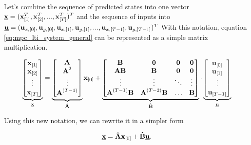 \documentclass{article}
\newcommand{\uvec}{\textbf{\underline{u}}}
\begin{document}
Let's combine the sequence of predicted states into one vector $\textbf{\underline{x}} = (\textbf{x}_{[1]}^T, \textbf{x}_{[2]}^T, ..., \textbf{x}_{[T]}^T)^T$ and the sequence of inputs into 
$\uvec = (\textbf{u}_{x,[0]}, \textbf{u}_{y,[0]}, \textbf{u}_{x,[1]}, \textbf{u}_{y,[1]}, ..., \textbf{u}_{x,[T-1]}, \textbf{u}_{y,[T-1]})^T$
With this notation, equation \ref{eq:mpc_lti_system_general} can be represented as a simple matrix multiplication.

\begin{equation}
\label{eq:prediction_big}
\underbrace{
\begin{bmatrix}
\textbf{x}_{[1]} \\
\textbf{x}_{[2]} \\
\vdots \\
\textbf{x}_{[T]} \\
\end{bmatrix}}_{\textbf{\underline{x}}}
=
\underbrace{
\begin{bmatrix}
\textbf{A} \\
\textbf{A}^2 \\
\vdots \\
\textbf{A}^{(T-1)} \\
\end{bmatrix}}_{\textbf{\^A}}
\textbf{x}_{[0]}
+
\underbrace{
\begin{bmatrix}
\textbf{B} & \textbf{0} & \textbf{0} & \textbf{0} \\
\textbf{AB} & \textbf{B} & \textbf{0} & \textbf{0} \\
\vdots & \vdots & \ddots & \vdots \\
\textbf{A}^{(T-1)}\textbf{B} & \textbf{A}^{(T-2)}\textbf{B} & \hdots & \textbf{B}
\end{bmatrix}
}_{\textbf{\^B}}
\cdot
\underbrace{
\begin{bmatrix}
\textbf{u}_{[0]} \\
\textbf{u}_{[1]} \\
\vdots \\
\textbf{u}_{[T-1]} \\
\end{bmatrix}}_{\uvec}
\end{equation}

Using this new notation, we can rewrite it in a simpler form

\begin{equation}
\label{eq:prediction_final}
\textbf{\underline{x}} = \textbf{\^A}\textbf{x}_{[0]} + \textbf{\^B}\uvec.
\end{equation}
\end{document}
